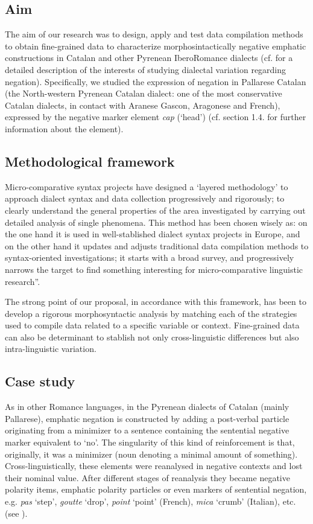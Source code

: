 \documentclass[output=paper]{LSP/langsci}
\begin{document}
\subsection{Aim}
The aim of our research was to design, apply and test data compilation methods to obtain fine-grained data to characterize morphosintactically negative emphatic constructions in Catalan and other Pyrenean IberoRomance dialects (cf. \citealt{berns_present-day_2002} for a detailed description of the interests of studying dialectal variation regarding negation).  Specifically, we studied the expression of negation in Pallarese Catalan (the North-western Pyrenean Catalan dialect: one of the most conservative Catalan dialects, in contact with Aranese Gascon, Aragonese and French), expressed by the negative marker element \textit{cap} (‘head’) (cf. section 1.4. for further information about the element). 

\subsection{Methodological framework}
Micro-comparative syntax projects have designed a ‘layered methodology’ \citep{cornips_field_2007} to approach dialect syntax and data collection progressively and rigorously; to clearly understand the general properties of the area investigated by carrying out detailed analysis of single phenomena. This method has been chosen wisely as: on the one hand it is used in well-stablished dialect syntax projects in Europe, and on the other hand it updates and adjusts traditional data compilation methods to syntax-oriented investigations; it starts with a broad survey, and progressively narrows the target to find something interesting for micro-comparative linguistic research”.

The strong point of our proposal, in accordance with this framework, has been to develop a rigorous morphosyntactic analysis by matching each of the strategies used to compile data related to a specific variable or context. Fine-grained data can also be determinant to stablish not only cross-linguistic differences but also intra-linguistic variation. 

\subsection{Case study}
As in other Romance languages, in the Pyrenean dialects of Catalan (mainly Pallarese), emphatic negation is constructed by adding a post-verbal particle originating from a minimizer to a sentence containing the sentential negative marker equivalent to ‘no’. The singularity of this kind of reinforcement is that, originally, it was a minimizer (noun denoting a minimal amount of something). Cross-linguistically, these elements were reanalysed in negative contexts and lost their nominal value. After different stages of reanalysis they became negative polarity items, emphatic polarity particles or even markers of sentential negation, e.g. \textit{pas} ‘step’,\textit{ goutte} ‘drop’, \textit{point} ‘point’ (French), \textit{mica} ‘crumb’ (Italian), etc. (see \citealt{schwegler_word-order_1988,detges_grammaticalization_2002}). 
\end{document}

